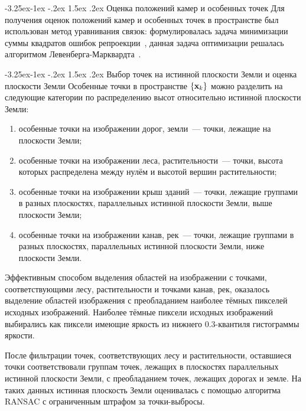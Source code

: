 \documentclass[a4paper,12pt]{article}
\makeatletter
\renewcommand\paragraph{\@startsection{paragraph}{4}{\z@}%
  {-3.25ex\@plus -1ex \@minus -.2ex}%
  {1.5ex \@plus .2ex}%
  {\normalfont\normalsize\bfseries}}
\makeatother
\begin{document}
\paragraph{Оценка положений камер и особенных точек}
Для получения оценок положений камер и особенных точек в пространстве был 
использован метод уравнивания связок: формулировалась задача 
минимизации суммы квадратов ошибок репроекции~\cite{szelisky10compvis}, данная задача 
оптимизации решалась алгоритмом 
Левенберга-Марквардта~\cite{levenberg44leastsquares, marquardt63leastsquares}.

\paragraph{Выбор точек на истинной плоскости Земли и оценка плоскости Земли}
Особенные точки в пространстве $\cbr{ \mathbf{x}_k }$ можно разделить на 
следующие категории по распределению высот относительно истинной плоскости 
Земли:
\begin{enumerate}
  \item особенные точки на изображении дорог, земли~--- точки, лежащие на
  плоскости Земли;
  \item особенные точки на изображении леса, растительности~---
  точки, высота которых распределена между нулём и высотой вершин 
  растительности;
  \item особенные точки на изображении крыш зданий~--- точки, лежащие 
  группами в разных плоскостях, параллельных истинной плоскости Земли, выше 
  плоскости Земли;
  \item особенные точки на изображении канав, рек~--- точки, лежащие 
  группами в разных плоскостях, параллельных истинной плоскости Земли, ниже 
  плоскости Земли.
\end{enumerate}

Эффективным способом выделения областей на изображении с точками, 
соответствующими лесу, растительности и точками канав, рек, оказалось 
выделение областей изображения с преобладанием наиболее тёмных пикселей 
исходных изображений.
Наиболее тёмные пиксели исходных изображений выбирались как пиксели имеющие 
яркость из нижнего 0.3-квантиля гистограммы яркости. 

После фильтрации точек, соответствующих лесу и растительности, 
оставшиеся точки соответствовали группам точек, лежащих в 
плоскостях параллельных истинной плоскости Земли, с преобладанием точек, 
лежащих дорогах и земле.
На таких данных истинная плоскость Земли оценивалась с помощью алгоритма 
RANSAC с ограниченным штрафом за точки-выбросы.
\end{document}
